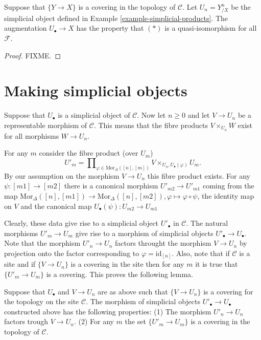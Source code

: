 \begin{lemma}
\label{lemma-product-hypercovering}
Suppose that $\{Y \to X\}$ is a covering in the topology of
$\mathcal{C}$. Let $U_n = Y^n_{/X}$ be the simplicial
object defined in Example \ref{example-simplicial-products}.
The augmentation $U_\bullet \to X$ has the property
that $(*)$ is a quasi-isomorphism for all $\mathcal{F}$.
\end{lemma}

\begin{proof}
FIXME.
\end{proof}

\section{Making simplicial objects}
\label{section-making-simplicial}

\noindent
Suppose that $U_\bullet$ is a simplicial object of $\mathcal{C}$. Now let
$n\geq 0$ and let $V \to U_n$ be a representable morphism of 
$\mathcal{C}$. This means that the fibre products $V \times_{U_n} W$ 
exist for all morphisms $W \to U_n$.

\smallskip\noindent
For any $m$ consider the fibre product (over $U_m$)
$$
U'_m = \prod\nolimits_{\varphi \in \text{Mor}_\Delta([n],[m])}
V\times_{U_n, U_\bullet(\varphi)} U_m.
$$
By our assumption on the morphism $V \to U_n$ this fibre product
exists. For any $\psi : [m1] \to [m2]$ there is a canonical morphism
$U'_{m2} \to U'_{m1}$ coming from the map $\text{Mor}_\Delta([n],[m1])
\to \text{Mor}_\Delta([n],[m2]), \varphi \mapsto \varphi \circ \psi$,
the identity map on $V$ and the canonical map $U_\bullet(\psi) : 
U_{m2} \to U_{m1}$

\smallskip\noindent
Clearly, these data give rise to a simplicial object $U'_\bullet$ in
$\mathcal{C}$. The natural morphisms $U'_m \to U_m$ give rise to a
morphism of simplicial objects $U'_\bullet \to U_\bullet$. Note that
the morphism $U'_n \to U_n$ factors throught the morphism $V \to U_n$
by projection onto the factor corresponding to $\varphi=\text{id}_{[n]}$.
Also, note that if $\mathcal{C}$ is a site and if 
$\{V \to U_n\}$ is a covering in the site then for any $m$ it is true
that $\{U'_m \to U_m\}$ is a covering. This proves the following lemma.

\begin{lemma}
\label{lemma-construct-new-covers}
Suppose that $U_\bullet$ and $V\to U_n$ are as above such that
$\{V \to U_n\}$ is a covering for the topology on the site
$\mathcal{C}$. The morphism of simplicial objects 
$U'_\bullet \to U_\bullet$ constructed above has the following 
properties:
(1) The morphism $U'_n \to U_n$ factors trough $V \to U_n$.
(2) For any $m$ the set $\{U'_m \to U_m\}$ is a covering
in the topology of $\mathcal{C}$.
\end{lemma}

